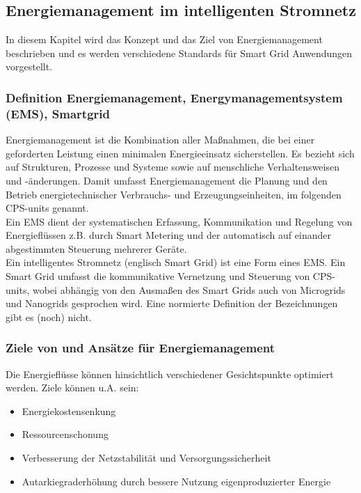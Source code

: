 

		\subsection{Energiemanagement im intelligenten Stromnetz}
		\label{Kap:Grundlagen_Energiemanagement}
		In diesem Kapitel wird das Konzept und das Ziel von Energiemanagement beschrieben und es werden verschiedene Standards für Smart Grid Anwendungen vorgestellt. 	
		
		\subsubsection{Definition Energiemanagement, Energymanagementsystem (EMS), Smartgrid}
			\glqq Energiemanagement ist die Kombination aller Maßnahmen, die bei einer geforderten Leistung einen minimalen Energieeinsatz sicherstellen. Es bezieht sich auf Strukturen, Prozesse und Systeme sowie auf menschliche Verhaltensweisen und -änderungen.\grqq \cite{Def_Energiemanagement} Damit umfasst Energiemanagement die Planung und den Betrieb energietechnischer Verbrauchs- und Erzeugungseinheiten, im folgenden \ac{CPS}-units genannt. \\ 
			
			Ein \ac{EMS} dient der systematischen Erfassung, Kommunikation und Regelung von Energieflüssen z.B. durch Smart Metering und der automatisch auf einander abgestimmten Steuerung mehrerer Geräte.\\
			
			Ein intelligentes Stromnetz (englisch Smart Grid) ist eine Form eines \ac{EMS}. Ein Smart Grid umfasst die kommunikative Vernetzung und Steuerung von CPS-units, wobei abhängig von den Ausmaßen des Smart Grids auch von Microgrids und Nanogrids gesprochen wird. Eine normierte Definition der Bezeichnungen gibt es (noch) nicht. \\
			
		\subsubsection{Ziele von und Ansätze für Energiemanagement}
			Die Energieflüsse können hinsichtlich verschiedener Gesichtspunkte optimiert werden. Ziele können u.A. sein:
			\begin{itemize}
				\item Energiekostensenkung
				\item Ressourcenschonung
				\item Verbesserung der Netzstabilität und Versorgungssicherheit
				\item Autarkiegraderhöhung durch bessere Nutzung eigenproduzierter Energie
			\end{itemize}


